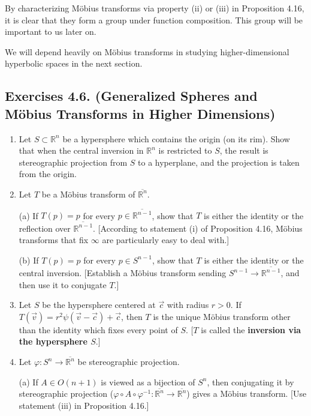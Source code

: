 \documentclass[leqno]{book}
\begin{document}
\noindent By characterizing M\"obius transforms via property (ii) or (iii) in Proposition 4.16, it is clear that they form a group under function composition.  This group will be important to us later on.

We will depend heavily on M\"obius transforms in studying higher-dimensional hyperbolic spaces in the next section.

\subsection*{Exercises 4.6. (Generalized Spheres and M\"obius Transforms in Higher Dimensions)} %
\begin{enumerate}
\item Let $S\subset\mathbb R^n$ be a hypersphere which contains the origin (on its rim).  Show that when the central inversion in $\mathbb R^n$ is restricted to $S$, the result is stereographic projection from $S$ to a hyperplane, and the projection is taken from the origin.

\item Let $T$ be a M\"obius transform of $\overline{\mathbb R^n}$.

(a) If $T(p)=p$ for every $p\in\overline{\mathbb R^{n-1}}$, show that $T$ is either the identity or the reflection over $\overline{\mathbb R^{n-1}}$.  [According to statement (i) of Proposition 4.16, M\"obius transforms that fix $\infty$ are particularly easy to deal with.]

(b) If $T(p)=p$ for every $p\in S^{n-1}$, show that $T$ is either the identity or the central inversion.  [Establish a M\"obius transform sending $S^{n-1}\to\overline{\mathbb R^{n-1}}$, and then use it to conjugate $T$.]

\item Let $S$ be the hypersphere centered at $\vec c$ with radius $r>0$.  If $T(\vec v)=r^2\psi(\vec v-\vec c)+\vec c$, then $T$ is the unique M\"obius transform other than the identity which fixes every point of $S$.  [$T$ is called the \textbf{inversion via the hypersphere $S$}.]

\item Let $\varphi:S^n\to\overline{\mathbb R^n}$ be stereographic projection.

(a) If $A\in O(n+1)$ is viewed as a bijection of $S^n$, then conjugating it by stereographic projection ($\varphi\circ A\circ\varphi^{-1}:\overline{\mathbb R^n}\to\overline{\mathbb R^n}$) gives a M\"obius transform.  [Use statement (iii) in Proposition 4.16.]


\end{enumerate}
\end{document}

